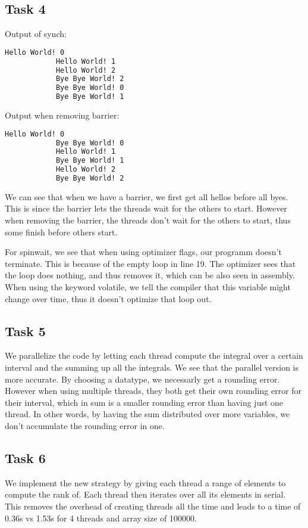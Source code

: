 \documentclass[a4paper]{scrartcl}
\begin{document}
    \subsection{Task 4}
        Output of synch:
        \begin{lstlisting}[language=bash]
            Hello World! 0
            Hello World! 1
            Hello World! 2
            Bye Bye World! 2
            Bye Bye World! 0
            Bye Bye World! 1
        \end{lstlisting}
        Output when removing barrier:
        \begin{lstlisting}[language=bash]
            Hello World! 0
            Bye Bye World! 0
            Hello World! 1
            Bye Bye World! 1
            Hello World! 2
            Bye Bye World! 2
        \end{lstlisting}

        We can see that when we have a barrier, we first get all hellos before
        all byes. This is since the barrier lets the threads wait for the others
        to start. However when removing the barrier, the threads don't wait for
        the others to start, thus some finish before others start.

        For spinwait, we see that when using optimizer flags, our programm
        doesn't terminate. This is because of the empty loop in line 19. The
        optimizer sees that the loop does nothing, and thus removes it, which
        can be also seen in assembly. When using the keyword volatile, we tell
        the compiler that this variable might change over time, thus it doesn't
        optimize that loop out.

    \subsection{Task 5}
        We parallelize the code by letting each thread compute the integral over
        a certain interval and the summing up all the integrals. We see that the
        parallel version is more accurate. By choosing a datatype, we necessarly
        get a rounding error. However when using multiple threads, they both get
        their own rounding error for their interval, which in sum is a smaller
        rounding error than having just one thread. In other words, by having
        the sum distributed over more variables, we don't accumulate the
        rounding error in one.

    \subsection{Task 6}
        We implement the new strategy by giving each thread a range of elements
        to compute the rank of. Each thread then iterates over all its elements
        in serial. This removes the overhead of creating threads all the time
        and leads to a time of 0.36s vs 1.53s for 4 threads and array size of
        100000. 
        
\end{document}
